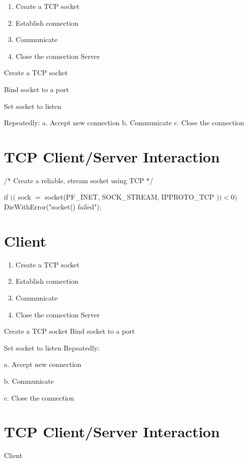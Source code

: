 \documentclass[10pt]{article}
\begin{document}
\begin{enumerate}
  \item Create a TCP socket

  \item Establish connection

  \item Communicate

  \item Close the connection Server

\end{enumerate}

Create a TCP socket

Bind socket to a port

Set socket to listen

Repeatedly:
a. Accept new connection
b. Communicate
c. Close the connection

\section{TCP Client/Server Interaction}
/* Create a reliable, stream socket using TCP */

if $(($ sock $=$ socket(PF\_INET, SOCK\_STREAM, IPPROTO\_TCP $))<0)$ DieWithError("socket() failed");

\section{Client}
\begin{enumerate}
  \item Create a TCP socket

  \item Establish connection

  \item Communicate

  \item Close the connection Server

\end{enumerate}

Create a TCP socket Bind socket to a port

Set socket to listen Repeatedly:

a. Accept new connection

b. Communicate

c. Close the connection

\section*{TCP Client/Server Interaction }
Client
\end{document}

